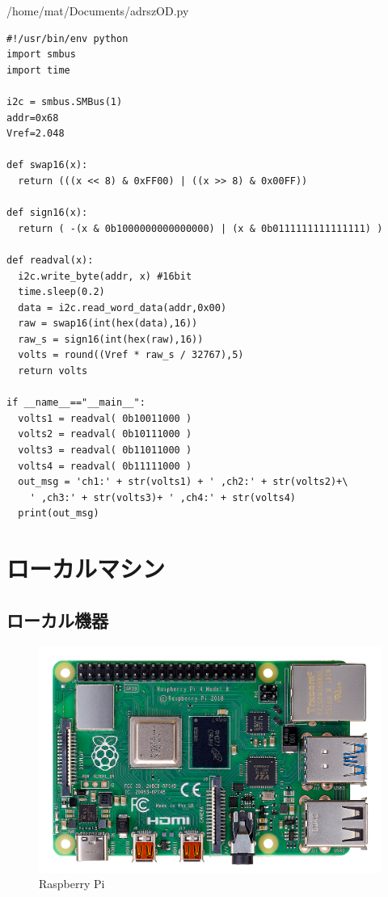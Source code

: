 \documentclass[12pt,a4paper,uplatex]{jsarticle}
\begin{document}
\begin{itembox}[l]{/home/mat/Documents/adrszOD.py}
	\begin{verbatim}
#!/usr/bin/env python
import smbus
import time

i2c = smbus.SMBus(1)
addr=0x68
Vref=2.048

def swap16(x):
  return (((x << 8) & 0xFF00) | ((x >> 8) & 0x00FF))

def sign16(x):
  return ( -(x & 0b1000000000000000) | (x & 0b0111111111111111) )

def readval(x):
  i2c.write_byte(addr, x) #16bit
  time.sleep(0.2)
  data = i2c.read_word_data(addr,0x00)
  raw = swap16(int(hex(data),16))
  raw_s = sign16(int(hex(raw),16))
  volts = round((Vref * raw_s / 32767),5)
  return volts

if __name__=="__main__":
  volts1 = readval( 0b10011000 )
  volts2 = readval( 0b10111000 )
  volts3 = readval( 0b11011000 )
  volts4 = readval( 0b11111000 )
  out_msg = 'ch1:' + str(volts1) + ' ,ch2:' + str(volts2)+\
    ' ,ch3:' + str(volts3)+ ' ,ch4:' + str(volts4)
  print(out_msg)
	\end{verbatim}
\end{itembox}

\section{ローカルマシン}

\subsection{ローカル機器}

\begin{figure}[H]
	\begin{minipage}[b]{1.0\linewidth}
		\centering
		\includegraphics[keepaspectratio, scale=0.12]{figs/jpg/udrp4b_front.jpg}
		\caption{Raspberry Pi}
	\end{minipage}
\end{figure}
\end{document}
